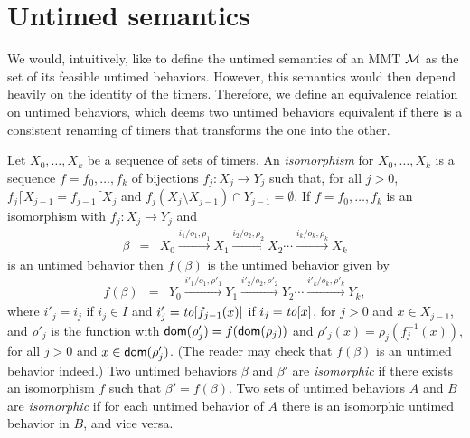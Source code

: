 \section{Untimed semantics}
\label{section untimed semantics}
We would, intuitively, like to define the untimed semantics of an MMT ${\cal M}$ as the set of its feasible untimed behaviors.
However, this semantics would then depend heavily on the identity of the timers. Therefore, we define an equivalence relation
on untimed behaviors, which deems two untimed behaviors equivalent if there is a consistent renaming of timers that transforms
the one into the other.

Let $X_0,\ldots, X_k$ be a sequence of sets of timers.
An \emph{isomorphism} for $X_0,\ldots, X_k$ is a sequence $f = f_0 ,\ldots, f_k$ of bijections $f_j : X_j \rightarrow Y_j$ such that,
for all $j>0$, $f_j \lceil X_{j-1} = f_{j-1} \lceil X_j$ and $f_j (X_j \setminus X_{j-1}) \cap Y_{j-1} = \emptyset$.
If $f = f_0 ,\ldots, f_k$ is an isomorphism with $f_j : X_j \rightarrow Y_j$ and
\begin{eqnarray*}
\beta & = & X_0 \xrightarrow{i_1/o_1, \rho_1} X_1  \xrightarrow{i_2/o_2, \rho_2} X_2 \cdots \xrightarrow{i_k/o_k, \rho_k} X_{k}
\end{eqnarray*}
is an untimed behavior then $f(\beta)$ is the untimed behavior given by
\begin{eqnarray*}
f(\beta) & = & Y_0 \xrightarrow{i'_1/o_1, \rho'_1} Y_1  \xrightarrow{i'_2/o_2, \rho'_2} Y_2 \cdots \xrightarrow{i'_k/o_k, \rho'_k} Y_{k},
\end{eqnarray*}
where 
$i'_j = i_j$ if $i_j \in I$ and $i'_j = \mathit{to}[f_{j-1}(x)]$ if $i_j = \mathit{to}[x]$, for $j>0$ and $x \in X_{j-1}$, and
$\rho'_j$ is the function with ${\textsf{dom}}(\rho'_j) = f({\textsf{dom}}(\rho_j))$ and
$\rho'_j(x) = \rho_j ( f_j^{-1}(x))$, for all $j>0$ and $x\in{\textsf{dom}}(\rho'_j)$.
(The reader may check that $f(\beta)$ is an untimed behavior indeed.)
Two untimed behaviors $\beta$ and $\beta'$ are \emph{isomorphic} if there exists an isomorphism $f$ such that
$\beta' = f(\beta)$.
Two sets of untimed behaviors $A$ and $B$ are \emph{isomorphic} if for each untimed behavior of $A$ there is an isomorphic untimed behavior in $B$,
and vice versa.
\iflong

